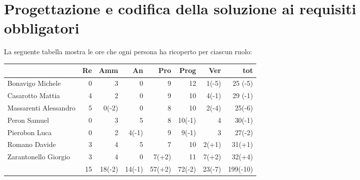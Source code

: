 \section{Progettazione e codifica della soluzione ai requisiti obbligatori}

La seguente tabella mostra le ore che ogni persona ha ricoperto per ciascun ruolo:

\begin{table}[ht]
    \begin{tabularx}{\linewidth}{X|rrrrrrr}
    \rowcolor{gray!30}& Re & Amm & An & Pro & Prog & Ver & tot \\
    \hline
    Bonavigo Michele                        & 0     & 3         & 0         & 9      & 12     & 1(-5)    & 25 (-5) \\ 

    \rowcolor{gray!10}Casarotto Mattia      & 4     & 2         & 0         & 9      & 10     & 4(-1)    & 29 (-1)\\ 

    Massarenti Alessandro                   & 5     & 0(-2)     & 0         & 8      & 10     & 2(-4)    & 25(-6) \\ 

    \rowcolor{gray!10}Peron Samuel          & 0     & 3         & 5         & 8      & 10(-1) & 4        & 30(-1) \\  

    Pierobon Luca                           & 0     & 2         & 4(-1)     & 9      & 9(-1)  & 3        & 27(-2) \\ 

    \rowcolor{gray!10}Romano Davide         & 3     & 4         & 5         & 7      & 10     & 2(+1)    & 31(+1) \\ 

    Zarantonello Giorgio                    & 3     & 4         & 0         & 7(+2)  & 11     & 7(+2)    & 32(+4) \\ 

    \hline                                  & 15    & 18(-2)    & 14(-1)   & 57(+2)  & 72(-2) & 23(-7)   & 199(-10) \\ 
    \end{tabularx}
\end{table}


